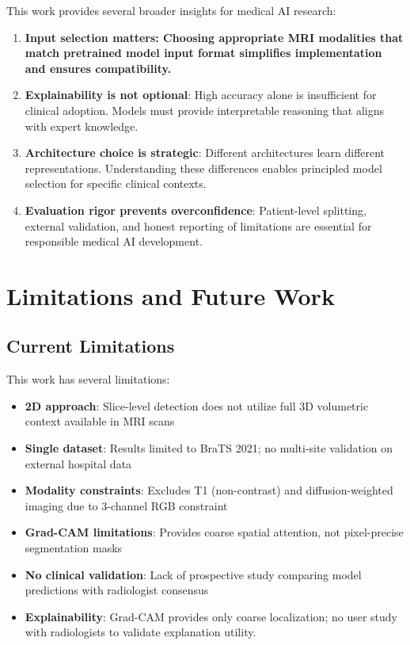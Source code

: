 This work provides several broader insights for medical AI research:

\begin{enumerate}
    \item \textbf{Input selection matters: Choosing appropriate MRI modalities that match pretrained model input format simplifies implementation and ensures compatibility.}

    \item \textbf{Explainability is not optional}: High accuracy alone is insufficient for clinical adoption. Models must provide interpretable reasoning that aligns with expert knowledge.

    \item \textbf{Architecture choice is strategic}: Different architectures learn different representations. Understanding these differences enables principled model selection for specific clinical contexts.

    \item \textbf{Evaluation rigor prevents overconfidence}: Patient-level splitting, external validation, and honest reporting of limitations are essential for responsible medical AI development.
\end{enumerate}

\section{Limitations and Future Work}

\subsection{Current Limitations}

This work has several limitations:

\begin{itemize}
    \item \textbf{2D approach}: Slice-level detection does not utilize full 3D volumetric context available in MRI scans

    \item \textbf{Single dataset}: Results limited to BraTS 2021; no multi-site validation on external hospital data

    \item \textbf{Modality constraints}: Excludes T1 (non-contrast) and diffusion-weighted imaging due to 3-channel RGB constraint

    \item \textbf{Grad-CAM limitations}: Provides coarse spatial attention, not pixel-precise segmentation masks

    \item \textbf{No clinical validation}: Lack of prospective study comparing model predictions with radiologist consensus

    \item \textbf{Explainability}: Grad-CAM provides only coarse localization; no user study with radiologists to validate explanation utility.
\end{itemize}

